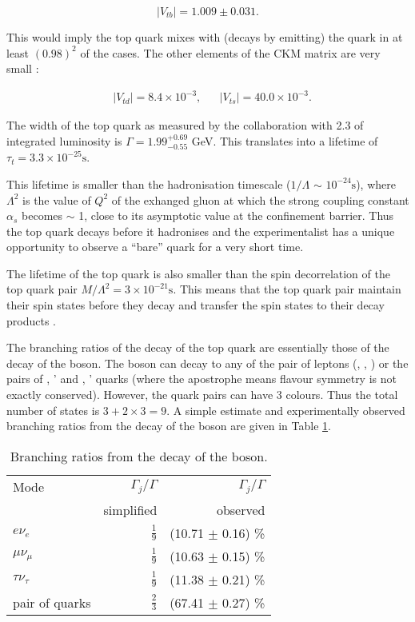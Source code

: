 \begin{equation}
  |V_{tb}|=1.009\pm0.031.
\end{equation}

This would imply the top quark mixes with (decays by emitting) the \cPqb quark in at least $(0.98)^{2}$ of the cases. The other elements of the CKM matrix are very small \cite{Patrignani:2016xqp}:

\begin{align}
  & |V_{td}|=8.4\times10^{-3}, && |V_{ts}|=40.0\times10^{-3}.
\end{align}

The width of the top quark as measured by the \DZERO collaboration \cite{Abazov:2010tm} with 2.3 \fbinv of integrated luminosity is $\Gamma=1.99^{+0.69}_{-0.55}$ GeV. This translates into a lifetime of $\tau_{t}=3.3\times10^{-25}\text{s}$.

This lifetime is smaller than the hadronisation timescale ($1/\Lambda$ $\sim$ $10^{-24}\text{s}$), where $\Lambda^{2}$ is the value of $Q^{2}$ of the exhanged gluon at which the strong coupling constant $\alpha_{s}$ becomes $\sim$ 1, close to its asymptotic value at the confinement barrier. Thus the top quark decays before it hadronises and the experimentalist has a unique opportunity to observe a ``bare'' quark for a very short time.

The lifetime of the top quark is also smaller than the spin decorrelation of the top quark pair $M/{\Lambda^{2}}=3\times 10^{-21}\text{s}$. This means that the top quark pair maintain their spin states before they decay and transfer the spin states to their decay products \cite{Cristinziani:2016vif}.

The branching ratios of the decay of the top quark are essentially those of the decay of the \PW boson. The \PW boson can decay to any of the pair of leptons (\Pe\Pgne, \Pgm\Pgngm, \Pgt\Pgngt) or the pairs of \cPqu, \cPqd' and \cPqc, \cPqs' quarks (where the apostrophe means flavour symmetry is not exactly conserved). However, the quark pairs can have 3 colours. Thus the total number of states is $3+2\times3=9$. A simple estimate and experimentally observed branching ratios from the decay of the \PW boson are given in Table \ref{tab:W_br}.

\begin{table}[h!]
  \centering
  \caption{Branching ratios from the decay of the \PW boson.}
  \label{tab:W_br}
  \begin{tabular}{l r r}
    Mode                  & $\Gamma_{j}/\Gamma$ & $\Gamma_{j}/\Gamma$\\
                          & simplified          & observed \cite{Patrignani:2016xqp}\\
    \hline
    $e\nu_{e}$            & $\frac{1}{9}$       & (10.71 $\pm$ 0.16) \%\\
    $\mu\nu_{\mu}$        & $\frac{1}{9}$       & (10.63 $\pm$ 0.15) \%\\
    $\tau\nu_{\tau}$      & $\frac{1}{9}$       & (11.38 $\pm$ 0.21) \%\\
    pair of quarks        & $\frac{2}{3}$       & (67.41 $\pm$ 0.27) \%
  \end{tabular}
\end{table}


